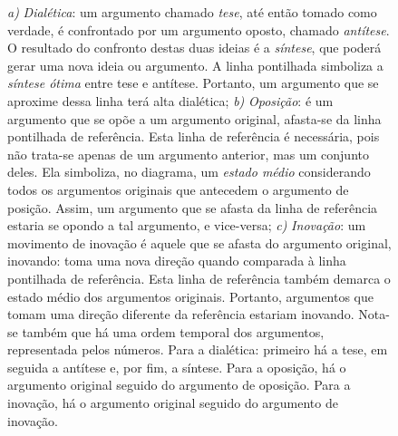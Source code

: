 \begin{figure}[ht!]
\begin{center}
\caption{\textit{a)} \textit{Dialética}: um argumento chamado \textit{tese}, até então
  tomado como verdade, é confrontado por um argumento oposto,
  chamado \textit{antítese}. O resultado do confronto destas duas
  ideias é a \textit{síntese}, que poderá gerar uma nova ideia ou
  argumento. A linha pontilhada simboliza a \textit{síntese ótima} entre tese e antítese. Portanto, um argumento que se aproxime dessa linha terá alta dialética; \textit{b)} \textit{Oposição}: é um argumento que se opõe
  a um argumento original, afasta-se da linha pontilhada de referência. Esta linha de referência é necessária, pois não trata-se apenas de um argumento anterior, mas um conjunto deles. Ela simboliza, no diagrama, um \textit{estado médio} considerando todos os argumentos originais que antecedem o argumento de posição. Assim, um argumento que se afasta da linha de referência estaria se opondo a tal argumento, e vice-versa; \textit{c)} \textit{Inovação}: um movimento
  de inovação é aquele que se afasta do argumento original, inovando: toma uma nova direção quando comparada à linha pontilhada de referência. Esta linha de referência também demarca o estado médio dos argumentos originais. Portanto, argumentos que tomam uma direção diferente da referência estariam inovando. Nota-se também que há uma ordem temporal dos argumentos, representada pelos números. Para a dialética: primeiro há a tese, em seguida a antítese e, por fim, a síntese. Para a oposição, há o argumento original seguido do argumento de oposição. Para a inovação, há o argumento original seguido do argumento de inovação.}
\label{fig:conceitos}

\vspace{30pt}

\end{center}
\end{figure}

